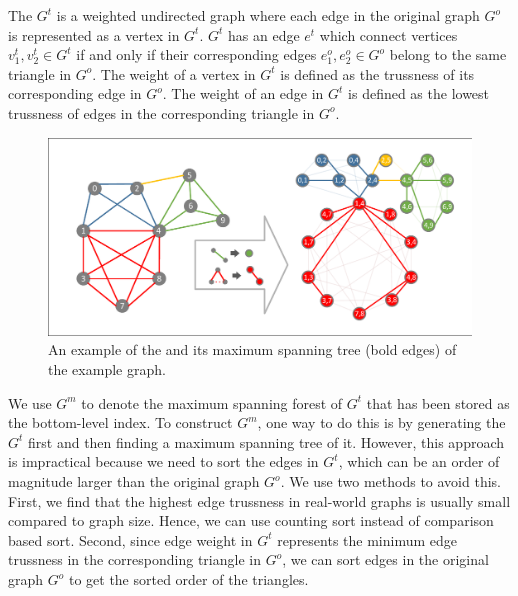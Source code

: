 \begin{Def}[\inducedgraph{}]
The \inducedgraph{} $G^t$ is a weighted undirected graph where each edge in the original graph $G^o$ is represented as a vertex in $G^t$. $G^t$ has an edge $e^{t}$ which connect vertices $v^{t}_{1}, v^{t}_{2} \in G^{t}$ if and only if their corresponding edges $e^{o}_{1}, e^{o}_{2} \in G^{o}$ belong to the same triangle in $G^o$. The weight of a vertex in $G^{t}$ is defined as the trussness of its corresponding edge in $G^o$. The weight of an edge in $G^{t}$ is defined as the lowest trussness of edges in the corresponding triangle in $G^{o}$. %
\label{def:\inducedgraph{}}
\end{Def}

\begin{figure}[h]
    \centering
    \includegraphics[width=0.8\linewidth, trim={0.8cm 0.6cm, 0.8cm, 0.6cm}, clip]{./figures/bottom_level.pdf}
		\vspace{-0.2cm}
    \caption{An example of the \inducedgraph{} and its maximum spanning tree (bold edges) of the example graph.} %
    \label{fig:\inducedgraph{}}
		\vspace{-0.2cm}
\end{figure}

We use $G^m$ to denote the maximum spanning forest of $G^t$ that has been stored as the bottom-level index. To construct $G^m$, one way to do this is by generating the \inducedgraph{} $G^t$ first and then finding a maximum spanning tree of it. However, this approach is impractical because we need to sort the edges in $G^t$, which can be an order of magnitude larger than the original graph $G^o$. We use two methods to avoid this. First, we find that the highest edge trussness in real-world graphs is usually small compared to graph size. Hence, we can use counting sort instead of comparison based sort. Second, since edge weight in $G^t$ represents the minimum edge trussness in the corresponding triangle in $G^o$, we can sort edges in the original graph $G^o$ to get the sorted order of the triangles. 

